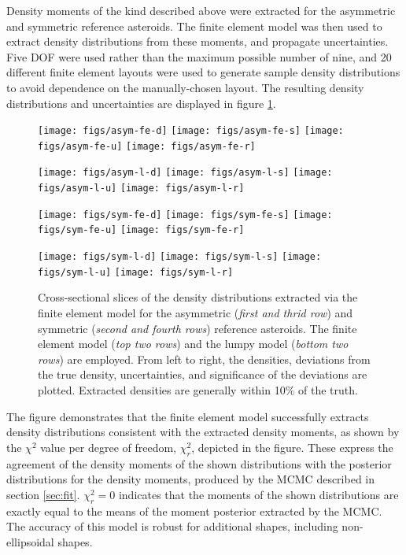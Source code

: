 \documentclass[fleqn,usenatbib]{mnras}
\begin{document}
Density moments of the kind described above were extracted for the asymmetric and symmetric reference asteroids. The finite element model was then used to extract density distributions from these moments, and propagate uncertainties. Five DOF were used rather than the maximum possible number of nine, and 20 different finite element layouts were used to generate sample density distributions to avoid dependence on the manually-chosen layout. The resulting density distributions and uncertainties are displayed in figure \ref{fig:uniform}.
\begin{figure}
  \texttt{[image: figs/asym-fe-d]}\hfill
  \texttt{[image: figs/asym-fe-s]}\hfill
  \texttt{[image: figs/asym-fe-u]}\hfill
  \texttt{[image: figs/asym-fe-r]}

  \texttt{[image: figs/asym-l-d]}\hfill
  \texttt{[image: figs/asym-l-s]}\hfill
  \texttt{[image: figs/asym-l-u]}\hfill
  \texttt{[image: figs/asym-l-r]}

  \texttt{[image: figs/sym-fe-d]}\hfill
  \texttt{[image: figs/sym-fe-s]}\hfill
  \texttt{[image: figs/sym-fe-u]}\hfill
  \texttt{[image: figs/sym-fe-r]}

  \texttt{[image: figs/sym-l-d]}\hfill
  \texttt{[image: figs/sym-l-s]}\hfill
  \texttt{[image: figs/sym-l-u]}\hfill
  \texttt{[image: figs/sym-l-r]}

  \caption{Cross-sectional slices of the density distributions extracted via the finite element model for the asymmetric (\textit{first and thrid row}) and symmetric (\textit{second and fourth rows}) reference asteroids. The finite element model (\textit{top two rows}) and the lumpy model (\textit{bottom two rows}) are employed. From left to right, the densities, deviations from the true density, uncertainties, and significance of the deviations are plotted. Extracted densities are generally within 10\% of the truth.}
  \label{fig:uniform}
\end{figure}

The figure demonstrates that the finite element model successfully extracts density distributions consistent with the extracted density moments, as shown by the $\chi^2$ value per degree of freedom, $\chi^2_r$, depicted in the figure. These express the agreement of the density moments of the shown distributions with the posterior distributions for the density moments, produced by the MCMC described in section \ref{sec:fit}. $\chi^2_r = 0$ indicates that the moments of the shown distributions are exactly equal to the means of the moment posterior extracted by the MCMC. The accuracy of this model is robust for additional shapes, including non-ellipsoidal shapes.
\end{document}
